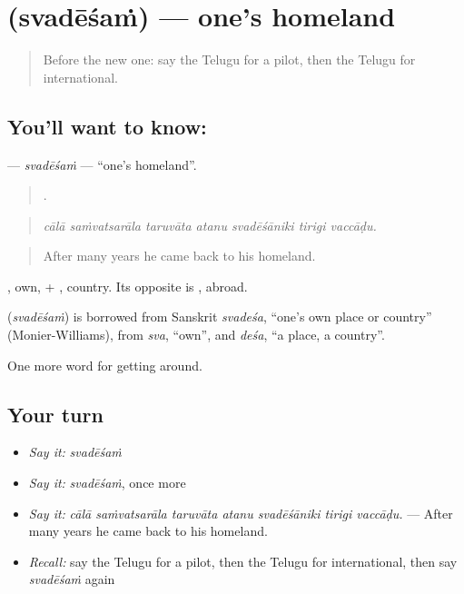 \section[\texorpdfstring{\te{స్వదేశం} (svadēśaṁ)}{స్వదేశం (svadēśaṁ)}]{ (svadēśaṁ) — one's homeland}

\label{lesson:TE-C454-svadesam}



\begin{quote}
Before the new one: say the Telugu for a pilot, then the Telugu for international.
\end{quote}

\subsection*{You'll want to know: }
\textbf{} — \emph{svadēśaṁ} — \textquotedblleft{}one's homeland\textquotedblright{}.

\begin{quote}
      .
\end{quote}

\begin{quote}
\emph{cālā saṁvatsarāla taruvāta atanu svadēśāniki tirigi vaccāḍu.}
\end{quote}

\begin{quote}
After many years he came back to his homeland.
\end{quote}

, own, + , country. Its opposite is , abroad.

\begin{cousinweb}
\textbf{} (\emph{svadēśaṁ}) is borrowed from Sanskrit \emph{svadeśa}, \textquotedblleft{}one's own place or country\textquotedblright{} (Monier-Williams), from \emph{sva}, \textquotedblleft{}own\textquotedblright{}, and \emph{deśa}, \textquotedblleft{}a place, a country\textquotedblright{}.
\end{cousinweb}

\begin{grammarlens}[title={What you've built}]
One more word for getting around.
\end{grammarlens}

\subsection*{Your turn}
\begin{itemize}
\raggedright
  \item \emph{Say it:} \emph{svadēśaṁ}
  \item \emph{Say it:} \emph{svadēśaṁ}, once more
  \item \emph{Say it:} \emph{cālā saṁvatsarāla taruvāta atanu svadēśāniki tirigi vaccāḍu.} — After many years he came back to his homeland.
  \item \emph{Recall:} say the Telugu for a pilot, then the Telugu for international, then say \emph{svadēśaṁ} again
\end{itemize}

